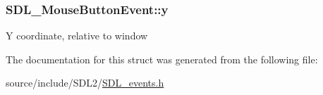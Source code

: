 \subsubsection[{y}]{ S\+D\+L\+\_\+\+Mouse\+Button\+Event\+::y}\label{struct_s_d_l___mouse_button_event_a7ccb5c55a7ddadce723f4ea6d5269540}
Y coordinate, relative to window 

The documentation for this struct was generated from the following file\+:\begin{DoxyCompactItemize}
\item 
source/include/\+S\+D\+L2/\hyperlink{_s_d_l__events_8h}{S\+D\+L\+\_\+events.\+h}\end{DoxyCompactItemize}
